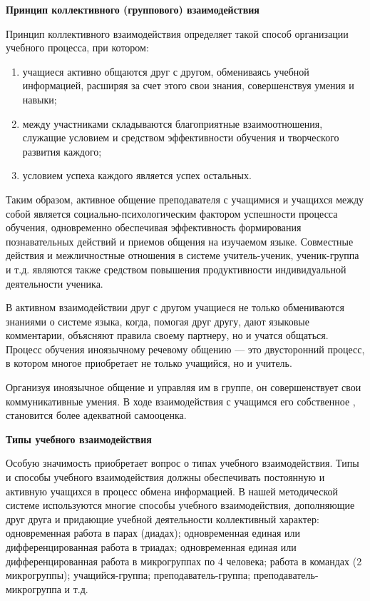 \textbf{Принцип коллективного (группового) взаимодействия}

Принцип коллективного взаимодействия определяет такой способ организации учебного процесса, при котором:
\begin{enumerate}
    \item учащиеся активно общаются друг с другом, обмениваясь учебной информацией, расширяя за счет этого свои знания, совершенствуя умения и навыки;
    \item между участниками складываются благоприятные взаимоотношения, служащие условием и средством эффективности обучения и творческого развития каждого;
    \item условием успеха каждого является успех остальных.
\end{enumerate}

Таким образом, активное общение преподавателя с учащимися и учащихся между собой является социально-психологическим фактором успешности процесса обучения, одновременно обеспечивая эффективность формирования познавательных действий и приемов общения на изучаемом языке. Совместные действия и межличностные отношения в системе учитель-ученик, ученик-группа и т.д. являются также средством повышения продуктивности индивидуальной деятельности ученика.

В активном взаимодействии друг с другом учащиеся не только обмениваются знаниями о системе языка, когда, помогая друг другу, дают языковые комментарии, объясняют правила своему партнеру, но и учатся общаться. Процесс обучения иноязычному речевому общению --- это двусторонний процесс, в котором многое приобретает не только учащийся, но и учитель.

Организуя иноязычное общение и управляя им в группе, он совершенствует свои коммуникативные умения. В ходе взаимодействия с учащимся  его собственное , становится более адекватной самооценка.

\textbf{Типы учебного взаимодействия }

Особую значимость приобретает вопрос о типах учебного взаимодействия. Типы и способы учебного взаимодействия должны обеспечивать постоянную и активную  учащихся в процесс обмена информацией. В нашей методической системе используются многие способы учебного взаимодействия, дополняющие друг друга и придающие учебной деятельности коллективный характер: одновременная работа в парах (диадах); одновременная единая или дифференцированная работа в триадах; одновременная единая или дифференцированная работа в микрогруппах по 4 человека; работа в командах (2 микрогруппы); учащийся-группа; преподаватель-группа; преподаватель-микрогруппа и т.д.

